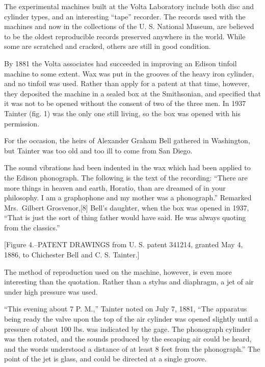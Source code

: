 \documentclass[12pt,oneside]{scrbook}
\begin{document}
  The experimental machines built at the Volta Laboratory include both
  disc and cylinder types, and an interesting ``tape'' recorder. The
  records used with the machines and now in the collections of the U. S.
  National Museum, are believed to be the oldest reproducible records
  preserved anywhere in the world. While some are scratched and cracked,
  others are still in good condition.
  
  By 1881 the Volta associates had succeeded in improving an Edison
  tinfoil machine to some extent. Wax was put in the grooves of the heavy
  iron cylinder, and no tinfoil was used. Rather than apply for a patent
  at that time, however, they deposited the machine in a sealed box at the
  Smithsonian, and specified that it was not to be opened without the
  consent of two of the three men. In 1937 Tainter (fig. 1) was the only
  one still living, so the box was opened with his permission.
  
  For the occasion, the heirs of Alexander Graham Bell gathered in
  Washington, but Tainter was too old and too ill to come from San Diego.
  
  The sound vibrations had been indented in the wax which had been applied
  to the Edison phonograph. The following is the text of the recording:
  ``There are more things in heaven and earth, Horatio, than are dreamed
  of in your philosophy. I am a graphophone and my mother was a
  phonograph.'' Remarked Mrs.~Gilbert Grosvenor,{[}8{]} Bell's daughter,
  when the box was opened in 1937, ``That is just the sort of thing father
  would have said. He was always quoting from the classics.''
  
  {[}Figure 4.--PATENT DRAWINGS from U. S. patent 341214, granted May 4,
  1886, to Chichester Bell and C. S. Tainter.{]}
  
  The method of reproduction used on the machine, however, is even more
  interesting than the quotation. Rather than a stylus and diaphragm, a
  jet of air under high pressure was used.
  
  ``This evening about 7 P. M.,'' Tainter noted on July 7, 1881, ``The
  apparatus being ready the valve upon the top of the air cylinder was
  opened slightly until a pressure of about 100 lbs. was indicated by the
  gage. The phonograph cylinder was then rotated, and the sounds produced
  by the escaping air could be heard, and the words understood a distance
  of at least 8 feet from the phonograph.'' The point of the jet is glass,
  and could be directed at a single groove.
  
\end{document}
